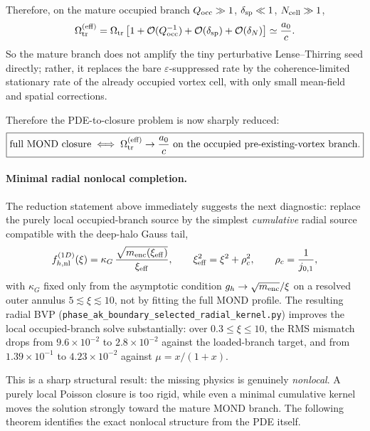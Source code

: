 \documentclass[11pt]{article}
\begin{document}
Therefore, on the mature occupied branch
$Q_{\rm occ}\gg1$, $\delta_{\rm sp}\ll1$, $N_{\rm cell}\gg1$,
\begin{equation}
\Omega_{\rm tr}^{\rm (eff)}
=
\Omega_{\rm tr}
\left[
1+\mathcal{O}(Q_{\rm occ}^{-1})
+ \mathcal{O}(\delta_{\rm sp})
+ \mathcal{O}(\delta_N)
\right]
\simeq \frac{a_0}{c}.
\label{eq:omega_eff_saturated}
\end{equation}
So the mature branch does not amplify the tiny perturbative
Lense--Thirring seed directly; rather, it replaces the bare
$\varepsilon$-suppressed rate by the coherence-limited stationary rate of
the already occupied vortex cell, with only small mean-field and spatial
corrections.

Therefore the PDE-to-closure problem is now sharply reduced:
\begin{equation}
\boxed{
\text{full MOND closure}
\iff
\Omega_{\rm tr}^{\rm (eff)} \to \frac{a_0}{c}
\text{ on the occupied pre-existing-vortex branch.}
}
\label{eq:closure_reduction_statement}
\end{equation}
\paragraph{Minimal radial nonlocal completion.}
The reduction statement above immediately suggests the next diagnostic:
replace the purely local occupied-branch source by the simplest
\emph{cumulative} radial source compatible with the deep-halo Gauss tail,
\begin{equation}
f_{h,\rm nl}^{(1D)}(\xi)
= \kappa_G\,
\frac{\sqrt{m_{\rm enc}(\xi_{\rm eff})}}{\xi_{\rm eff}},
\qquad
\xi_{\rm eff}^2=\xi^2+\rho_c^2,
\qquad
\rho_c=\frac{1}{j_{0,1}},
\label{eq:radial_nonlocal_source}
\end{equation}
with $\kappa_G$ fixed only from the asymptotic condition
$g_h\to\sqrt{m_{\rm enc}}/\xi$ on a resolved outer annulus
$5\lesssim\xi\lesssim10$, not by fitting the full MOND profile.  The
resulting radial BVP (\nolinkurl{phase_ak_boundary_selected_radial_kernel.py})
improves the local occupied-branch solve substantially:
over $0.3\le\xi\le10$, the RMS mismatch drops from
$9.6\times10^{-2}$ to $2.8\times10^{-2}$ against the loaded-branch
target, and from $1.39\times10^{-1}$ to $4.23\times10^{-2}$ against
$\mu=x/(1+x)$.

This is a sharp structural result: the missing physics is genuinely
\emph{nonlocal}.  A purely local Poisson closure is too rigid, while
even a minimal cumulative kernel moves the solution strongly toward
the mature MOND branch.  The following theorem identifies the exact
nonlocal structure from the PDE itself.
\end{document}
